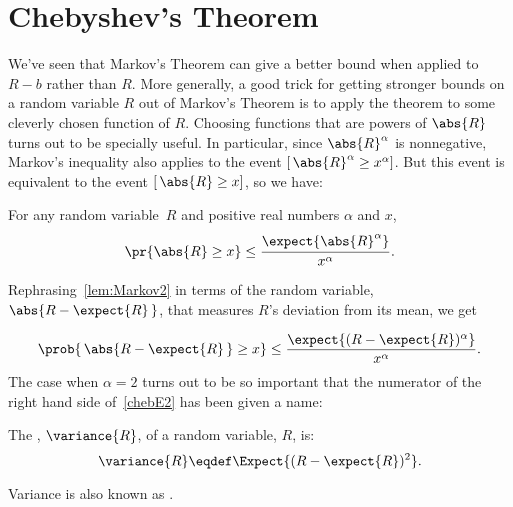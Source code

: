 \begin{problems}

\practiceproblems
{}

\classproblems
{}

\homeworkproblems
{}
\end{problems}

\section{Chebyshev's Theorem}

We've seen that Markov's Theorem can give a better bound when applied
to $R-b$ rather than $R$.  More generally, a good trick for getting
stronger bounds on a random variable $R$ out of Markov's Theorem is to
apply the theorem to some cleverly chosen function of $R$.
Choosing functions that are powers of $\abs{R}$ turns out to be
specially useful.  In particular, since $\abs{R}^\alpha$ is
nonnegative, Markov's inequality also applies to the event
$[\, \abs{R}^\alpha \geq x^\alpha]$.  But this event is equivalent to the
event $[\, \abs{R} \geq x]$, so we have:

\iffalse
It is a bit messy to apply Markov's Theorem directly to this problem,
because it's generally not easy to compute $\expect{\ \abs{R -
\expect{R}}\ }$.  However, since $\abs{R}$ and hence $\abs{R}^k$ are
nonnegative variables for any $R$, Markov's inequality also applies to the
event $[\abs{R}^k \geq x^k]$.  But this event is equivalent to the event
$[\abs{R} \geq x]$, so we have:
\fi

\begin{lemma}\label{lem:Markov2}
For any random variable~$R$ and positive real numbers $\alpha$ and $x$,
\[
\pr{\abs{R} \geq x} \leq \frac{\expect{\strut \abs{R}^\alpha}}{x^\alpha}.
\]
\end{lemma}
Rephrasing~\eqref{lem:Markov2} in terms of the random variable,
$\abs{R -  \expect{R}\, }$, that measures $R$'s deviation from its mean, we get

\begin{equation}\label{chebE2}
  \prob{\,\abs{R - \expect{R}\,} \geq x} \leq \frac{\expect{(R - \expect{R})^\alpha}}{x^\alpha}.
\end{equation}
The case when $\alpha =2$ turns out to be so important that the 
numerator of the right hand side of~\eqref{chebE2} has been given a 
name:

\begin{definition}\label{defvar}
The , $\variance{R}$, of a random variable, $R$, is:
\[
\variance{R} \eqdef \Expect{(R - \expect{R})^2}.
\]
\end{definition}
Variance is also known as .

